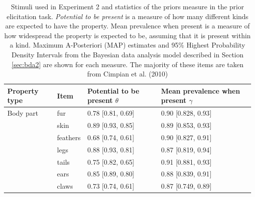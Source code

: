 \documentclass[12pt,letterpaper]{article}
\begin{document}

    
\begin{table}[h]
\centering
\caption{Stimuli used in Experiment 2 and statistics of the priors measure in the prior elicitation task. 
\emph{Potential to be present} is a measure of how many different kinds are expected to have the property. Mean prevalence when present is a measure of how widespread the property is expected to be, assuming that it is present within a kind.
Maximum A-Posteriori (MAP) estimates and 95\% Highest Probability Density Intervals from the Bayesian data analysis model described in Section \ref{sec:bda2} are shown for each measure.
The majority of these items are taken from Cimpian et al. (2010)}
\label{tab:novelGenericsStimuli}
\begin{tabular}{| l || l | l | l |}
\hline
Property type     & Item               & Potential to be present $\theta$ & Mean prevalence when present $\gamma$ \\
\hline
\hline
Body part         & fur                & 0.78 {[}0.81, 0.69{]}   & 0.90 {[}0.828, 0.93{]}       \\
                  & skin               & 0.89 {[}0.93, 0.85{]}   & 0.89 {[}0.853, 0.93{]}       \\
                  & feathers           & 0.68 {[}0.74, 0.61{]}   & 0.90 {[}0.827, 0.91{]}       \\
                  & legs               & 0.88 {[}0.93, 0.81{]}   & 0.87 {[}0.819, 0.94{]}       \\
                  & tails              & 0.75 {[}0.82, 0.65{]}   & 0.91 {[}0.881, 0.93{]}       \\
                  & ears               & 0.85 {[}0.89, 0.80{]}   & 0.88 {[}0.839, 0.91{]}       \\
                  & claws              & 0.73 {[}0.74, 0.61{]}   & 0.87 {[}0.749, 0.89{]}       \\

\end{tabular}
\end{table}
\end{document}
